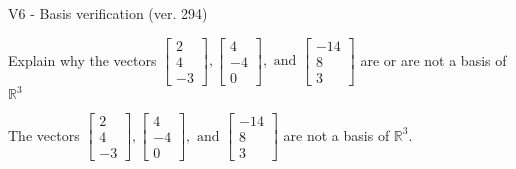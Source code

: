 \begin{exercise}
  \begin{exerciseTitle}V6 - Basis verification (ver. 294)\end{exerciseTitle}
  \begin{exerciseStatement}
    Explain why the vectors \(\left[\begin{array}{r}
2 \\
4 \\
-3
\end{array}\right] , \left[\begin{array}{r}
4 \\
-4 \\
0
\end{array}\right] , \text{ and } \left[\begin{array}{r}
-14 \\
8 \\
3
\end{array}\right]\) are or are not a basis of \(\mathbb{R}^3\)	


  \end{exerciseStatement}
  \begin{exerciseAnswer}
   The vectors \(\left[\begin{array}{r}
2 \\
4 \\
-3
\end{array}\right] , \left[\begin{array}{r}
4 \\
-4 \\
0
\end{array}\right] , \text{ and } \left[\begin{array}{r}
-14 \\
8 \\
3
\end{array}\right]\) 
  	 are not  a basis of \(\mathbb{R}^3\).
  


  \end{exerciseAnswer}
\end{exercise}